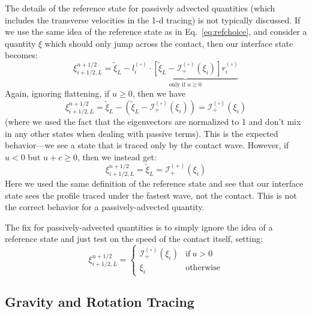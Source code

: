 \documentclass{emulateapj}
\newcommand{\evz}{{(\circ)}}
\newcommand{\evp}{{(+)}}
\begin{document}
The details of the reference state for passively advected quantities 
(which includes the transverse velocities in the 1-d tracing) is not
typically discussed.  If we use the same idea of the reference state as
in Eq.~\ref{eq:refchoice}, and consider a quantity $\xi$ which should only
jump across the contact, then our interface state becomes:
\begin{equation}
\xi_{i+1/2,L}^{n+1/2} = \tilde{\xi}_L -
  \underbrace{l_i^\evz \cdot \left [
        \tilde{\xi}_L  - \mathcal{I}^\evz_+(\xi_i)
       \right ] r_i^\evz}_{\text{only if~$u \ge 0$}}
\end{equation}
Again, ignoring flattening, if $u \ge 0$, then we have
\begin{equation}
\xi_{i+1/2,L}^{n+1/2} = \tilde{\xi}_L -
  \left (\tilde{\xi}_L  - \mathcal{I}^\evz_+(\xi_i) \right ) = \mathcal{I}^\evz_+(\xi_i)
\end{equation}
(where we used the fact that the eigenvectors are normalized to 1 and
don't mix in any other states when dealing with passive terms).  This
is the expected behavior---we see a state that is traced only by the
contact wave.  However, if $u < 0$ but $u + c \ge 0$, then we instead get:
\begin{equation}
\xi_{i+1/2,L}^{n+1/2} = \tilde{\xi}_L = \mathcal{I}^\evp_+(\xi_i)
\end{equation}
Here we used the same definition of the reference state and see that our
interface state sees the profile traced under the fastest wave, not the
contact.  This is not the correct behavior for a passively-advected
quantity.  

The fix for passively-advected quantities is to simply ignore the 
idea of a reference state and just test on the speed of the contact
itself, setting:
\begin{equation}
\xi_{i+1/2,L}^{n+1/2} = \left \{ \begin{array}{cc}
       \mathcal{I}_+^\evz(\xi_i) & \mathrm{if~} u  > 0 \\
       \xi_i                    & \mathrm{otherwise}
\end{array}
\right .
\end{equation}



\subsection{Gravity and Rotation Tracing}
\end{document}
